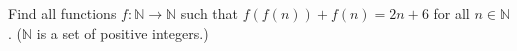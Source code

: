 \problem
Find all functions  $f \colon \mathbb{N} \to \mathbb{N}$ such that
$f(f(n)) + f(n) = 2 n + 6$ for all $n \in \mathbb{N}$.
($\mathbb{N}$ is a set of positive integers.)

\solution

\endproblem
